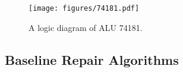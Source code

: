 \documentclass[letterpaper]{article}
\begin{document}


\begin{figure}{}%
\begin{center}
  \texttt{[image: figures/74181.pdf]}
  \caption{A logic diagram of ALU 74181.}
  \label{fig:74181}
\end{center}
\end{figure}


\subsection{Baseline Repair Algorithms}
\end{document}
